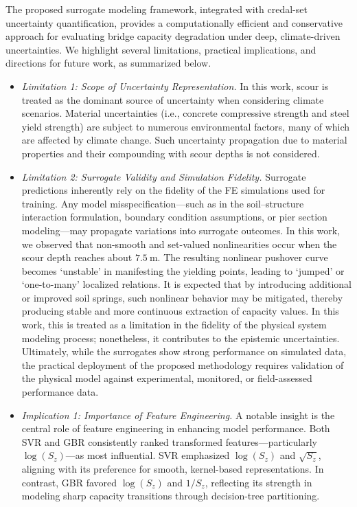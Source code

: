\documentclass[authoryear,preprint,review,12pt]{elsarticle}
\begin{document}
The proposed surrogate modeling framework, integrated with credal-set uncertainty quantification, provides a computationally efficient and conservative approach for evaluating bridge capacity degradation under deep, climate-driven uncertainties. We highlight several limitations, practical implications, and directions for future work, as summarized below.

\begin{itemize}

    \item \textit{Limitation 1: Scope of Uncertainty Representation.} In this work, scour is treated as the dominant source of uncertainty when considering climate scenarios. Material uncertainties (i.e., concrete compressive strength and steel yield strength) are subject to numerous environmental factors, many of which are affected by climate change. Such uncertainty propagation due to material properties and their compounding with scour depths is not considered.

    \item \textit{Limitation 2: Surrogate Validity and Simulation Fidelity.} 
    Surrogate predictions inherently rely on the fidelity of the FE simulations used for training. Any model misspecification—such as in the soil–structure interaction formulation, boundary condition assumptions, or pier section modeling—may propagate variations into surrogate outcomes. In this work, we observed that non-smooth and set-valued nonlinearities occur when the scour depth reaches about $7.5\ \mathrm{m}$. The resulting nonlinear pushover curve becomes ‘unstable’ in manifesting the yielding points, leading to ‘jumped’ or ‘one-to-many’ localized relations. It is expected that by introducing additional or improved soil springs, such nonlinear behavior may be mitigated, thereby producing stable and more continuous extraction of capacity values. In this work, this is treated as a limitation in the fidelity of the physical system modeling process; nonetheless, it contributes to the epistemic uncertainties. Ultimately, while the surrogates show strong performance on simulated data, the practical deployment of the proposed methodology requires validation of the physical model against experimental, monitored, or field-assessed performance data.

    \item \textit{Implication 1: Importance of Feature Engineering.} 
    A notable insight is the central role of feature engineering in enhancing model performance. Both SVR and GBR consistently ranked transformed features—particularly $\log(S_z)$—as most influential. SVR emphasized $\log(S_z)$ and $\sqrt{S_z}$, aligning with its preference for smooth, kernel-based representations. In contrast, GBR favored $\log(S_z)$ and $1/S_z$, reflecting its strength in modeling sharp capacity transitions through decision-tree partitioning.


\end{itemize}
\end{document}
